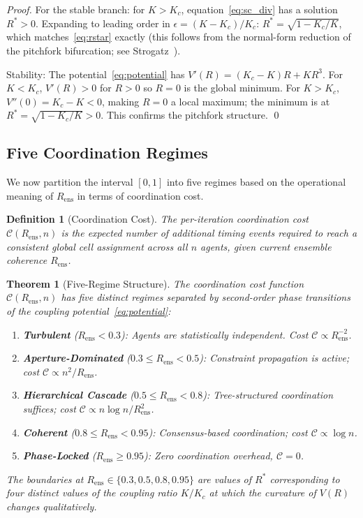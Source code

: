 \documentclass[twocolumn,10pt]{article}
\newtheorem{theorem}{Theorem}[section]
\newtheorem{definition}{Definition}[section]
\newcommand{\Rens}{R_{\mathrm{ens}}}
\newcommand{\Kc}{K_c}
\begin{document}
\begin{proof}
For the stable branch: for $K > \Kc$, equation~\eqref{eq:sc_div} has a
solution $R^* > 0$. Expanding to leading order in $\epsilon = (K - \Kc)/\Kc$:
$R^* = \sqrt{1 - \Kc/K}$, which matches~\eqref{eq:rstar} exactly (this
follows from the normal-form reduction of the pitchfork bifurcation; see
Strogatz~\cite{Strogatz2000}).

Stability: The potential~\eqref{eq:potential} has $V'(R) = (\Kc - K)R + KR^3$.
For $K < \Kc$, $V'(R) > 0$ for $R > 0$ so $R = 0$ is the global minimum. For
$K > \Kc$, $V''(0) = \Kc - K < 0$, making $R = 0$ a local maximum; the
minimum is at $R^* = \sqrt{1 - \Kc/K} > 0$. This confirms the pitchfork
structure. \qed
\end{proof}

\subsection{Five Coordination Regimes}

We now partition the interval $[0,1]$ into five regimes based on the
operational meaning of $\Rens$ in terms of coordination cost.

\begin{definition}[Coordination Cost]
\label{def:coord_cost}
The \emph{per-iteration coordination cost} $\mathcal{C}(\Rens, n)$ is the
expected number of additional timing events required to reach a consistent
global cell assignment across all $n$ agents, given current ensemble
coherence $\Rens$.
\end{definition}

\begin{theorem}[Five-Regime Structure]
\label{thm:five_regimes}
The coordination cost function $\mathcal{C}(\Rens, n)$ has five distinct
regimes separated by second-order phase transitions of the coupling
potential~\eqref{eq:potential}:

\begin{enumerate}[label=\textbf{R\arabic*.}]
\item \textbf{Turbulent} ($\Rens < 0.3$): Agents are statistically
      independent. Cost $\mathcal{C} \propto \Rens^{-2}$.

\item \textbf{Aperture-Dominated} ($0.3 \leq \Rens < 0.5$): Constraint
      propagation is active; cost $\mathcal{C} \propto n^2/\Rens$.

\item \textbf{Hierarchical Cascade} ($0.5 \leq \Rens < 0.8$): Tree-structured
      coordination suffices; cost $\mathcal{C} \propto n\log n/\Rens^2$.

\item \textbf{Coherent} ($0.8 \leq \Rens < 0.95$): Consensus-based
      coordination; cost $\mathcal{C} \propto \log n$.

\item \textbf{Phase-Locked} ($\Rens \geq 0.95$): Zero coordination overhead,
      $\mathcal{C} = 0$.
\end{enumerate}
The boundaries at $\Rens \in \{0.3, 0.5, 0.8, 0.95\}$ are values of $R^*$
corresponding to four distinct values of the coupling ratio $K/\Kc$ at which
the curvature of $V(R)$ changes qualitatively.
\end{theorem}
\end{document}
